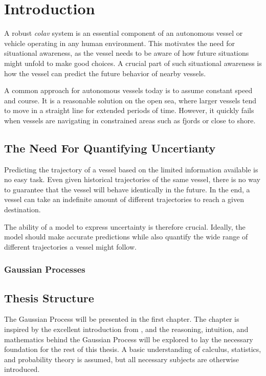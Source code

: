 \chapter{Introduction}
A robust \textit{\acrfull{colav}} system is an essential component of an autonomous vessel or vehicle operating in any human environment. This motivates the need for situational awareness, as the vessel needs to be aware of how future situations might unfold to make good choices. A crucial part of such situational awareness is how the vessel can predict the future behavior of nearby vessels. 

A common approach for autonomous vessels today is to assume constant speed and course. It is a reasonable solution on the open sea, where larger vessels tend to move in a straight line for extended periods of time. However, it quickly fails when vessels are navigating in constrained areas such as fjords or close to shore.    


\section{The Need For Quantifying Uncertianty}
Predicting the trajectory of a vessel based on the limited information available is no easy task. Even given historical trajectories of the same vessel, there is no way to guarantee that the vessel will behave identically in the future. In the end, a vessel can take an indefinite amount of different trajectories to reach a given destination. 

The ability of a model to express uncertainty is therefore crucial. Ideally, the model should make accurate predictions while also quantify the wide range of different trajectories a vessel might follow. 

\subsection{Gaussian Processes}







\section{Thesis Structure}
The Gaussian Process will be presented in the first chapter. The chapter is inspired by the excellent introduction from \cite{rasmussen}, and the reasoning, intuition, and mathematics behind the Gaussian Process will be explored to lay the necessary foundation for the rest of this thesis. A basic understanding of calculus, statistics, and probability theory is assumed, but all necessary subjects are otherwise introduced.  

